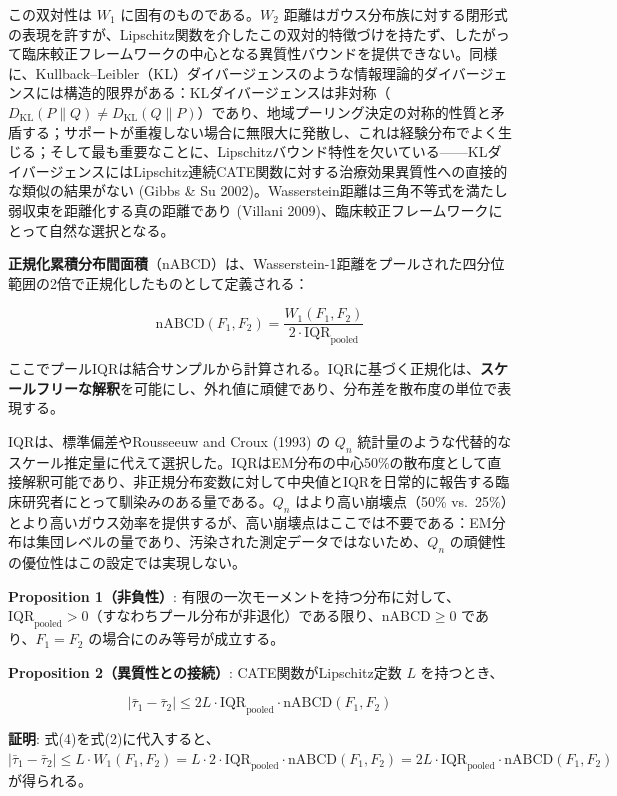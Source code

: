 \documentclass[
  a4paper,
  11pt]{ltjsarticle}
\begin{document}
この双対性は \(W_1\) に固有のものである。\(W_2\)
距離はガウス分布族に対する閉形式の表現を許すが、Lipschitz関数を介したこの双対的特徴づけを持たず、したがって臨床較正フレームワークの中心となる異質性バウンドを提供できない。同様に、Kullback--Leibler（KL）ダイバージェンスのような情報理論的ダイバージェンスには構造的限界がある：KLダイバージェンスは非対称（\(D_{\text{KL}}(P \| Q) \neq D_{\text{KL}}(Q \| P)\)）であり、地域プーリング決定の対称的性質と矛盾する；サポートが重複しない場合に無限大に発散し、これは経験分布でよく生じる；そして最も重要なことに、Lipschitzバウンド特性を欠いている------KLダイバージェンスにはLipschitz連続CATE関数に対する治療効果異質性への直接的な類似の結果がない
(Gibbs \& Su
2002)。Wasserstein距離は三角不等式を満たし弱収束を距離化する真の距離であり
(Villani 2009)、臨床較正フレームワークにとって自然な選択となる。

\textbf{正規化累積分布間面積}（nABCD）は、Wasserstein-1距離をプールされた四分位範囲の2倍で正規化したものとして定義される：

\[\text{nABCD}(F_1, F_2) = \frac{W_1(F_1, F_2)}{2 \cdot \text{IQR}_{\text{pooled}}} \tag{4}\]

ここでプールIQRは結合サンプルから計算される。IQRに基づく正規化は、\textbf{スケールフリーな解釈}を可能にし、外れ値に頑健であり、分布差を散布度の単位で表現する。

IQRは、標準偏差やRousseeuw and Croux (1993) の \(Q_n\)
統計量のような代替的なスケール推定量に代えて選択した。IQRはEM分布の中心50\%の散布度として直接解釈可能であり、非正規分布変数に対して中央値とIQRを日常的に報告する臨床研究者にとって馴染みのある量である。\(Q_n\)
はより高い崩壊点（50\%
vs.~25\%）とより高いガウス効率を提供するが、高い崩壊点はここでは不要である：EM分布は集団レベルの量であり、汚染された測定データではないため、\(Q_n\)
の頑健性の優位性はこの設定では実現しない。

\textbf{Proposition 1（非負性）}:
有限の一次モーメントを持つ分布に対して、\(\text{IQR}_{\text{pooled}} > 0\)（すなわちプール分布が非退化）である限り、\(\text{nABCD} \geq 0\)
であり、\(F_1 = F_2\) の場合にのみ等号が成立する。

\textbf{Proposition 2（異質性との接続）}: CATE関数がLipschitz定数 \(L\)
を持つとき、

\[|\bar{\tau}_1 - \bar{\tau}_2| \leq 2L \cdot \text{IQR}_{\text{pooled}} \cdot \text{nABCD}(F_1, F_2) \tag{5}\]

\textbf{証明}:
式(4)を式(2)に代入すると、\(|\bar{\tau}_1 - \bar{\tau}_2| \leq L \cdot W_1(F_1, F_2) = L \cdot 2 \cdot \text{IQR}_{\text{pooled}} \cdot \text{nABCD}(F_1, F_2) = 2L \cdot \text{IQR}_{\text{pooled}} \cdot \text{nABCD}(F_1, F_2)\)
が得られる。
\end{document}
